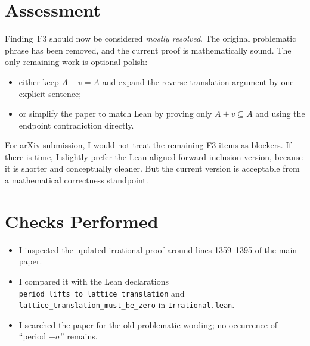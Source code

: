 \documentclass[11pt]{article}
\begin{document}
\section*{Assessment}

Finding~F3 should now be considered \emph{mostly resolved}.  The original
problematic phrase has been removed, and the current proof is mathematically
sound.  The only remaining work is optional polish:
\begin{itemize}[leftmargin=*]
  \item either keep \(A+v=A\) and expand the reverse-translation argument by
        one explicit sentence;
  \item or simplify the paper to match Lean by proving only
        \(A+v\subseteq A\) and using the endpoint contradiction directly.
\end{itemize}

For arXiv submission, I would not treat the remaining F3 items as blockers.
If there is time, I slightly prefer the Lean-aligned forward-inclusion version,
because it is shorter and conceptually cleaner.  But the current version is
acceptable from a mathematical correctness standpoint.

\section*{Checks Performed}

\begin{itemize}[leftmargin=*]
  \item I inspected the updated irrational proof around
        lines 1359--1395 of the main paper.
  \item I compared it with the Lean declarations
        \texttt{period\_lifts\_to\_lattice\_translation} and
        \texttt{lattice\_translation\_must\_be\_zero} in
        \texttt{Irrational.lean}.
  \item I searched the paper for the old problematic wording; no occurrence
        of ``period \(-\sigma\)'' remains.
\end{itemize}
\end{document}
